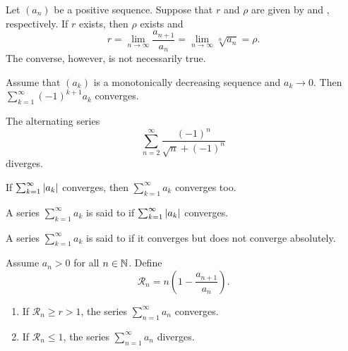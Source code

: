 \begin{proposition}
  Let $(a_n)$ be a positive sequence. Suppose that $r$ and $\rho$ are
  given by  and , respectively.
  If $r$ exists, then $\rho$ exists and
  \[ r = \lim_{n \to \infty} \frac{a_{n + 1}}{a_n} = \lim_{n \to
  \infty} \sqrt[n]{a_n} = \rho. \]
  The converse, however, is not necessarily true.
\end{proposition}

\begin{proposition}
  Assume that $(a_k)$ is a monotonically decreasing sequence and $a_k
  \to 0$. Then $\sum_{k = 1}^{\infty} (-1)^{k + 1} a_k$ converges.
\end{proposition}

\begin{example}
  The alternating series
  \[ \sum_{n = 2}^{\infty} \frac{(-1)^n}{\sqrt{n} + (-1)^n} \]
  diverges.
\end{example}

\begin{proposition}
  If $\sum_{k = 1}^{\infty} | a_k |$ converges, then $\sum_{k =
  1}^{\infty} a_k$ converges too.
\end{proposition}

\begin{definition}
  A series $\sum_{k = 1}^{\infty} a_k$ is said to  if $\sum_{k = 1}^{\infty} | a_k |$ converges.
\end{definition}

\begin{definition}
  A series $\sum_{k = 1}^{\infty} a_k$ is said to  if it converges but does not converge absolutely.
\end{definition}

\begin{proposition}
  Assume $a_n > 0$ for all $n \in \mathbb N$. Define
  \[ \mathcal{R}_n = n \left(1 - \frac{a_{n + 1}}{a_n}\right). \]
  \begin{enumerate}
    \item If $\mathcal{R}_n \geq r > 1$, the series $\sum_{n =
      1}^{\infty} a_n$ converges.
    \item If $\mathcal{R}_n \leq 1$, the series $\sum_{n =
      1}^{\infty} a_n$ diverges.
  \end{enumerate}
\end{proposition}

